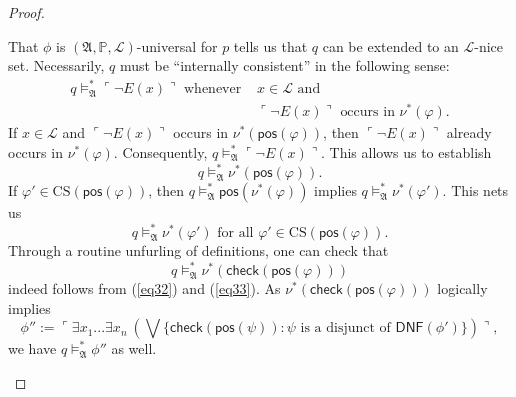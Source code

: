 \documentclass[12pt]{article}
\numberwithin{equation}{section}
\begin{document}
\begin{proof}
\begin{enumerate}[label=Case \arabic*:, leftmargin=50pt]
    That $\phi$ is $(\mathfrak{A}, \mathbb{P}, \mathcal{L})$-universal for $p$ tells us that $q$ can be extended to an $\mathcal{L}$-nice set. Necessarily, $q$ must be ``internally consistent'' in the following sense:
    \begin{align*}
        q \models^{*}_{\mathfrak{A}} \ulcorner \neg E(x) \urcorner \text{ whenever } & x \in \mathcal{L} \text{ and } \\
        & \ulcorner \neg E(x) \urcorner \text{ occurs in } \nu^*(\varphi).
    \end{align*} 
    If $x \in \mathcal{L}$ and $\ulcorner \neg E(x) \urcorner$ occurs in $\nu^*(\mathsf{pos}(\varphi))$, then $\ulcorner \neg E(x) \urcorner$ already occurs in $\nu^*(\varphi)$. Consequently, $q \models^{*}_{\mathfrak{A}} \ulcorner \neg E(x) \urcorner$. This allows us to establish 
    \begin{equation}\label{eq32}
        q \models^{*}_{\mathfrak{A}} \nu^*(\mathsf{pos}(\varphi)).
    \end{equation} 
    If $\varphi' \in \mathrm{CS}(\mathsf{pos}(\varphi))$, then $q \models^{*}_{\mathfrak{A}} \mathsf{pos}(\nu^*(\varphi))$ implies $q \models^{*}_{\mathfrak{A}} \nu^*(\varphi')$. This nets us 
    \begin{equation}\label{eq33}
        q \models^{*}_{\mathfrak{A}} \nu^*(\varphi') \text{ for all } \varphi' \in \mathrm{CS}(\mathsf{pos}(\varphi)).
    \end{equation}
    Through a routine unfurling of definitions, one can check that $$q \models^{*}_{\mathfrak{A}} \nu^*(\mathsf{check}(\mathsf{pos}(\varphi)))$$ indeed follows from (\ref{eq32}) and (\ref{eq33}). As $\nu^*(\mathsf{check}(\mathsf{pos}(\varphi)))$ logically implies $$\phi'' := \ulcorner \exists x_1 ... \exists x_n \ (\bigvee \{\mathsf{check}(\mathsf{pos}(\psi)) : \psi \text{ is a disjunct of } \mathsf{DNF}(\phi')\}) \urcorner,$$ we have $q \models^{*}_{\mathfrak{A}} \phi''$ as well.
    

\end{enumerate}
\end{proof}
\end{document}
